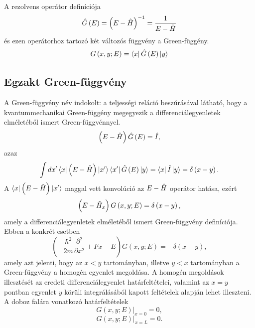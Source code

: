 A rezolvens operátor definíciója
\begin{equation}
    \hat{G}\left( E \right) = \left(E-\hat{H}\right)^{-1} = \frac{1}{E-\hat{H}}
\end{equation}
és ezen operátorhoz tartozó két változós függvény a Green-függény.
\begin{equation}
    G\left( x, y; E \right) = \Bra{x}\hat{G}\left(E\right)\Ket{y}
\end{equation}
\subsection{Egzakt Green-függvény}
A Green-függvény név indokolt: a teljességi reláció beszúrásával látható, hogy a kvantummechanikai Green-függény megegyezik a differenciálegyenletek elméletéből ismert Green-függvénnyel.
\begin{equation}
    \left(E-\hat{H}\right)\hat{G}\left( E \right) = \hat{I},
\end{equation}
azaz
\begin{equation}
    \int dx^\prime \Bra{x}\left(E-\hat{H}\right) \Ket{x^\prime}\Bra{x^\prime} \hat{G}\left( E \right)\Ket{y} = \Bra{x}\hat{I}\Ket{y} = \delta \left(x - y\right).
\end{equation} 
A $\Bra{x}\left(E-\hat{H}\right) \Ket{x^\prime}$ maggal vett konvolúció az $E-\hat{H}$ operátor hatása, ezért
\begin{equation}
    \left(E-\hat{H}_x\right) G\left(x, y; E\right) = \delta\left(x - y\right),
\end{equation}
amely a differenciálegyenletek elméletéből ismert Green-függvény definíciója. Ebben a konkrét esetben
\begin{equation}
    \left( -\frac{\hbar^2}{2m}\frac{\partial^2}{\partial x^2} + Fx - E \right) G\left(x, y; E\right) = -\delta\left(x - y\right),
	\label{green:deltaeq}
\end{equation}
amely azt jelenti, hogy az $x < y$ tartományban, illetve $y < x$ tartományban a Green-függvény a homogén egyenlet megoldása. A homogén megoldások illesztését az eredeti differenciálegyenlet határfeltételei, valamint az $x = y$ pontban  egyenlet $y$ körüli integrálásából kapott feltételek alapján lehet illeszteni. A doboz falára vonatkozó határfeltételek
\begin{equation}
	\left. G\left(x,y;E\right)\right\rvert_{x = 0} = 0,
	\label{green:01}
\end{equation}
\begin{equation}
	\left. G\left(x,y;E\right)\right\rvert_{x = L} = 0.
	\label{green:02}
\end{equation}
